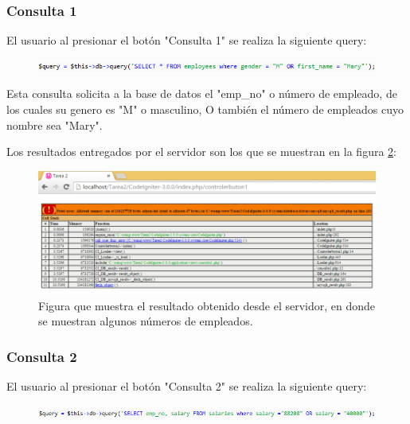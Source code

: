 \subsubsection{Consulta 1}

El usuario al presionar el botón "Consulta 1" se realiza la siguiente query:

\begin{figure}[htb]
	\label{Figura2}
	\begin{center}
		\includegraphics[scale=0.7]{imagenes/query1.png}
	\end{center}
\end{figure}

Esta consulta solicita a la base de datos el "emp\_no" o número de empleado, de los cuales su genero es "M" o masculino, O también el número de empleados cuyo nombre sea "Mary".

Los resultados entregados por el servidor son los que se muestran en la figura \ref{Figura3}:

\begin{figure}[htb]
	\label{Figura3}
	\begin{center}
		\includegraphics[scale=0.7]{imagenes/resultado1.png}
		\caption{Figura que muestra el resultado obtenido desde el servidor, en donde se muestran algunos números de empleados.}
	\end{center}
\end{figure}

\subsubsection{Consulta 2}

El usuario al presionar el botón "Consulta 2" se realiza la siguiente query:

\begin{figure}[htb]
	\label{Figura4}
	\begin{center}
		\includegraphics[scale=0.7]{imagenes/query2.png}
	\end{center}
\end{figure}


